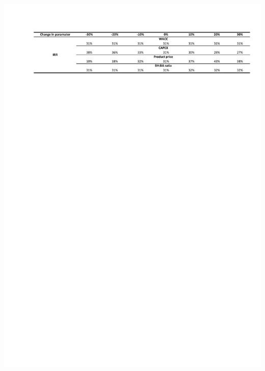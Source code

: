 \begin{table}[H]
    \centering
    \includegraphics[clip, trim = 1cm 15cm 1cm 1cm, width=\linewidth]{chapters/6-economics/figures/sensitivity1.pdf}
    \label{tab:de-proscons}
\end{table}